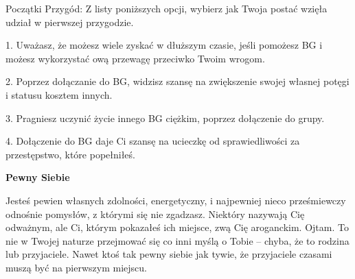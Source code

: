 Początki Przygód: Z listy poniższych opcji, wybierz jak Twoja postać wzięła udział w pierwszej przygodzie.

1. Uważasz, że możesz wiele zyskać w dłuższym czasie, jeśli pomożesz BG i możesz wykorzystać ową przewagę przeciwko Twoim wrogom.

2. Poprzez dołączanie do BG, widzisz szansę na zwiększenie swojej własnej potęgi i statusu kosztem innych.

3. Pragniesz uczynić życie innego BG ciężkim, poprzez dołączenie do grupy.

4. Dołączenie do BG daje Ci szansę na ucieczkę od sprawiedliwości za przestępstwo, które popełniłeś. 

\textbf{Pewny Siebie}

Jesteś pewien własnych zdolności, energetyczny, i najpewniej nieco prześmiewczy odnośnie pomysłów, z którymi się nie zgadzasz.  Niektóry nazywają Cię odważnym, ale Ci, którym pokazałeś ich miejsce, zwą Cię aroganckim. Ojtam. To nie w Twojej naturze przejmować się co inni myślą o Tobie – chyba, że to rodzina lub przyjaciele. Nawet ktoś tak pewny siebie jak tywie, że przyjaciele czasami muszą być na pierwszym miejscu.

